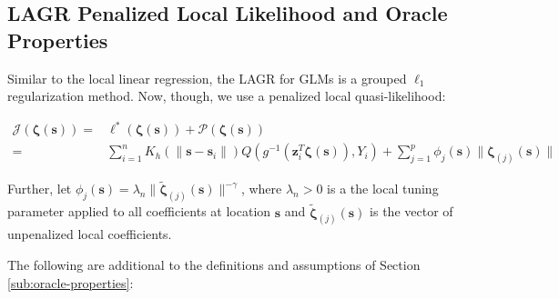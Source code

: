 \documentclass[authoryear,review, 12pt]{elsarticle}
\begin{document}
\subsection{LAGR Penalized Local Likelihood and Oracle Properties}

Similar to the local linear regression, the LAGR for GLMs is a grouped
$\ell_{1}$ regularization method. Now, though, we use a penalized
local quasi-likelihood:

\begin{align*}
\mathcal{J}\left(\bm{\zeta}(\bm{s})\right)= & \mathcal{\ell}^{*}\left(\bm{\zeta}(\bm{s})\right)+\mathcal{P}\left(\bm{\zeta}(\bm{s})\right)\\
= & \sum_{i=1}^{n}K_{h}\left(\|\bm{s}-\bm{s}_{i}\|\right)Q\left(g^{-1}\left(\bm{z}_{i}^{T}\bm{\zeta}(\bm{s})\right),Y_{i}\right)+\sum_{j=1}^{p}\phi_{j}(\bm{s})\|\bm{\zeta}_{(j)}(\bm{s})\|
\end{align*}


Further, let $\phi_{j}(\bm{s})=\lambda_{n}\|\tilde{\bm{\zeta}}_{(j)}(\bm{s})\|^{-\gamma}$,
where $\lambda_{n}>0$ is a the local tuning parameter applied to
all coefficients at location $\bm{s}$ and $\tilde{\bm{\zeta}}_{(j)}(\bm{s})$
is the vector of unpenalized local coefficients.

The following are additional to the definitions and assumptions of
Section \ref{sub:oracle-properties}:
\end{document}
